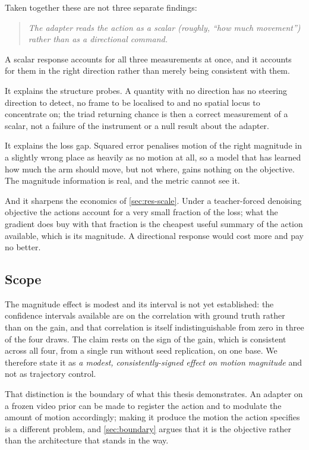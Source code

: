 Taken together these are not three separate findings:

\begin{quote}
\emph{The adapter reads the action as a scalar (roughly, ``how much
movement'') rather than as a directional command.}
\end{quote}

A scalar response accounts for all three measurements at once, and it
accounts for them in the right direction rather than merely being consistent
with them.

It explains the structure probes. A quantity with no direction has no
steering direction to detect, no frame to be localised to and no spatial
locus to concentrate on; the triad returning chance is then a correct
measurement of a scalar, not a failure of the instrument or a null result
about the adapter.

It explains the loss gap. Squared error penalises motion of the right
magnitude in a slightly wrong place as heavily as no motion at all, so a
model that has learned how much the arm should move, but not where,
gains nothing on the objective. The magnitude information is real, and the
metric cannot see it.

And it sharpens the economics of \cref{sec:res-scale}. Under a
teacher-forced denoising objective the actions account for a very small
fraction of the loss; what the gradient does buy with that fraction is the
cheapest useful summary of the action available, which is its magnitude.
A directional response would cost more and pay no better.

\subsection{Scope}

The magnitude effect is modest and its interval is not yet established: the
confidence intervals available are on the correlation with ground truth
rather than on the gain, and that correlation is itself indistinguishable
from zero in three of the four draws. The claim rests on the sign of the
gain, which is consistent across all four, from a single run without seed
replication, on one base. We therefore state it as \emph{a modest,
consistently-signed effect on motion magnitude} and not as trajectory
control.

That distinction is the boundary of what this thesis demonstrates. An
adapter on a frozen video prior can be made to register the action and to
modulate the amount of motion accordingly; making it produce the motion the
action specifies is a different problem, and \cref{sec:boundary} argues that
it is the objective rather than the architecture that stands in the way.

